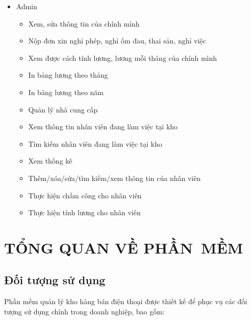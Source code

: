 \documentclass[a4paper,12pt]{report}
\begin{document}
\begin{itemize}
\begin{itemize}
              \item Thêm/xóa/sửa/tìm kiếm/xem thông tin của nhân viên
              \item Thực hiện chấm công cho nhân viên
              \item Thực hiện tính lương cho nhân viên
          \end{itemize}
    \item Admin
          \begin{itemize}
              \item Xem, sửa thông tin của chính mình
              \item Nộp đơn xin nghỉ phép, nghỉ ốm đau, thai sản, nghỉ việc
              \item Xem được cách tính lương, lương mỗi tháng của chính mình
              \item In bảng lương theo tháng
              \item In bảng lương theo năm
              \item Quản lý nhà cung cấp
              \item Xem thông tin nhân viên đang làm việc tại kho
              \item Tìm kiếm nhân viên đang làm việc tại kho
              \item Xem thống kê
              \item Thêm/xóa/sửa/tìm kiếm/xem thông tin của nhân viên
              \item Thực hiện chấm công cho nhân viên
              \item Thực hiện tính lương cho nhân viên
          \end{itemize}
\end{itemize}
\chapter{TỔNG QUAN VỀ PHẦN~MỀM}
\section{Đối tượng sử dụng}
\quad Phần mềm quản lý kho hàng bán điện thoại được thiết kế để phục vụ các đối tượng sử dụng chính trong doanh nghiệp, bao gồm:

\vspace{0.8em}
\end{document}

